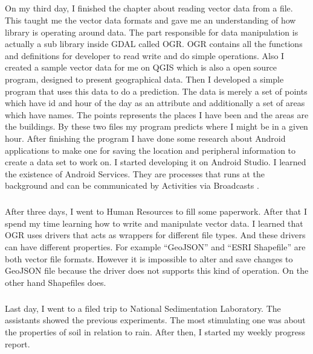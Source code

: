 \documentclass{article}
\begin{document}
\subparagraph{}
On my third day, I finished the chapter about reading vector data from a file. This taught me the vector data formats and gave me an understanding of how library is operating around data. The part responsible for data manipulation is actually a sub library inside GDAL called OGR. OGR contains all the functions and definitions for developer to read write and do simple operations. Also I created a sample vector data for me on QGIS which is also a open source program, designed to present geographical data. Then I developed a simple program that uses this data to do a prediction. The data is merely a set of points which have id and hour of the day as an attribute and additionally a set of areas which have names. The points represents the places I have been and the areas are the buildings. By these two files my program predicts where I might be in a given hour. After finishing the program I have done some research about Android applications to make one for saving the location and peripheral information to create a data set to work on. I started developing it on Android Studio. I learned the existence of Android Services. They are processes that runs at the background and can be communicated by Activities via Broadcasts \cite{andriod}.

\subparagraph{}
After three days, I went to Human Resources to fill some paperwork. After that I spend my time learning how to write and manipulate vector data. I learned that OGR uses drivers that acts as wrappers for different file types. And these drivers can have different properties. For example “GeoJSON” and “ESRI Shapefile” are both vector file formats. However it is impossible to alter and save changes to GeoJSON file because the driver does not supports this kind of operation. On the other hand Shapefiles does.

\subparagraph{}
Last day, I went to a filed trip to National Sedimentation Laboratory. The assistants showed the previous experiments. The most stimulating one was about the properties of soil in relation to rain. After then, I started my weekly progress report.

\printbibliography
\end{document}
